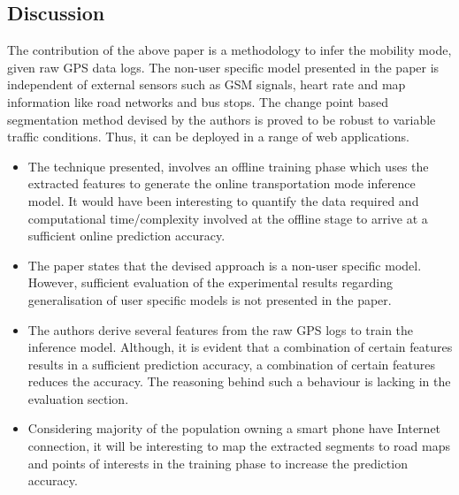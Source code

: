 \subsection{Discussion} \label{lect1-disc}

The contribution of the above paper is a methodology to infer the mobility mode, given raw GPS
data logs. The non-user specific model presented in the paper is independent of external sensors 
such as GSM signals, heart rate and map information like road networks and bus stops. The change 
point based segmentation method devised by the authors is proved to be robust to variable traffic
conditions. Thus, it can be deployed in a range of web applications.      


\begin{itemize}

\item The technique presented, involves an offline training phase which uses the extracted features 
to generate the online transportation mode inference model. It would have been interesting to quantify 
the data required and computational time/complexity involved at the offline stage to arrive at a sufficient
online prediction accuracy.

\item The paper states that the devised approach is a non-user specific model. However, sufficient 
evaluation of the experimental results regarding generalisation of user specific models is not presented
in the paper. 

\item The authors derive several features from the raw GPS logs to train the inference model. Although, 
it is evident that a combination of certain features results in a sufficient prediction accuracy, a 
combination of certain features reduces the accuracy. The reasoning behind such a behaviour is lacking 
in the evaluation section. 

\item Considering majority of the population owning a smart phone have Internet connection, it will be
interesting to map the extracted segments to road maps and points of interests in the training phase 
to increase the prediction accuracy. 


\end{itemize}